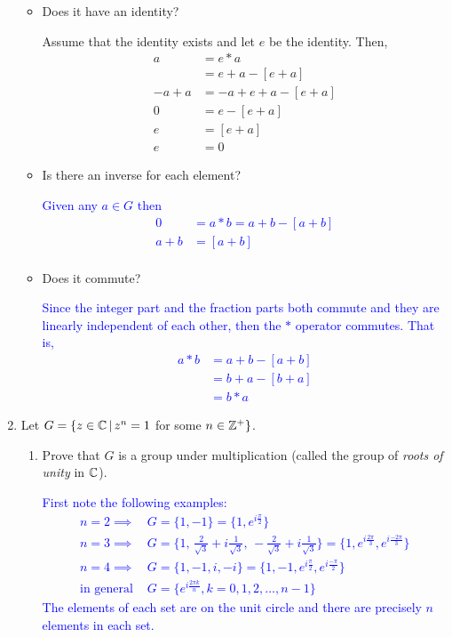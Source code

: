 \documentclass[10pt,a4paper]{report}
\newcommand{\BLUE}[1]{\textcolor{blue}{#1}}
\begin{document}
\begin{enumerate}
\begin{itemize}
			\item Does it have an identity?
			
			Assume that the identity exists and let $e$ be the identity.  Then, 
			\begin{align*}
				a &= e*a \\
					&= e+a-[e+a] \\
				-a+a &= -a+e+a-[e+a] \\
				0 &= e-[e+a] \\				
				e &= [e+a] \\
				e &= 0
			\end{align*}
			
			\item Is there an inverse for each element?	
			
			\BLUE{Given any $a\in G$ then
			\begin{align*}
				0&= a*b = a+b-[a+b] \\
				a+b &= [a+b] \\
			\end{align*}
			}	
			\item Does it commute?
			
			\BLUE{Since the integer part and the fraction parts both commute and they are linearly independent of each other, then the $*$ operator commutes.  That is,
			\begin{align*}
				a*b &= a+b-[a+b]\\
				&= b+a-[b+a] \\
				&= b*a
			\end{align*} }
		\end{itemize}		 
	
	\item Let $G = \{z\in \mathbb{C}\,|\, z^n=1$ for some $n \in \mathbb{Z}^+\}$.
		\begin{enumerate}
			\item Prove that $G$ is a group under multiplication (called the group of \textit{roots of unity} in $\mathbb{C}$).
			
			\BLUE{First note the following examples:
			\begin{align*}
				n=2 \implies &G=\{ 1, -1 \} = \{ 1, e^{i\frac{\pi}{2}}\}\\
				n=3 \implies &G=\{ 1,\, \frac{2}{\sqrt{3}}+i\frac{1}{\sqrt{3}},\, -\frac{2}{\sqrt{3}}+i\frac{1}{\sqrt{3}} \} = \{1, e^{i\frac{2\pi}{3}}, e^{i\frac{-2\pi}{3}}\}\\
				n=4 \implies &G=\{ 1, -1, i, -i \} = \{ 1, -1, e^{i\frac{\pi}{2}}, e^{i\frac{-\pi}{2}}\} \\
				\text{in general } &G=\{e^{i \frac{2\pi k}{n}}, k=0,1,2, \dots, n-1\}
			\end{align*}The elements of each set are on the unit circle and there are precisely $n$ elements in each set.
			} 
			

\end{enumerate}
\end{enumerate}
\end{document}
